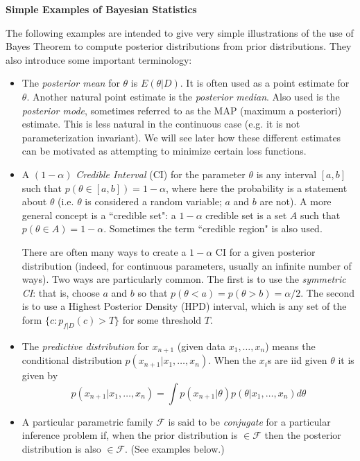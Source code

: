 \documentclass{article}[11pt]
\begin{document}


\begin{center}
\Large\bf Simple Examples of Bayesian Statistics
\end{center}
\vskip 6mm
\normalsize

The following examples are intended to give
very simple illustrations of the use of Bayes Theorem
to compute posterior distributions from prior distributions. They also introduce some important
terminology:

\begin{itemize}
\item The {\it posterior mean} for $\theta$ is $E(\theta | D)$. It is often used as a point estimate for $\theta$. Another natural point estimate is the {\it posterior median}. Also used is the {\it posterior mode}, sometimes referred to as the MAP (maximum a posteriori) estimate. This is less natural in the continuous case (e.g. it is not parameterization invariant). We will see later how these different estimates can be motivated as attempting to minimize certain loss functions.
\item A $(1-\alpha)$ {\it Credible Interval} (CI) for the parameter $\theta$ is any interval $[a,b]$ such that $p(\theta \in [a,b])= 1-\alpha$, where here the probability is a statement about $\theta$ (i.e. $\theta$ is considered a random variable; $a$ and $b$ are not).  A more general concept is a ``credible set": a $1-\alpha$ credible set is a set $A$ such that $p(\theta \in A)= 1-\alpha$. Sometimes the term ``credible region" is also used.

There are often many  ways to create a $1-\alpha$ CI for a given posterior distribution (indeed, for continuous parameters, usually an infinite number of ways). Two ways are particularly common. The first is to use the {\it symmetric CI}: that is, choose $a$ and $b$ so that $p(\theta < a) = p(\theta>b) = \alpha/2$. The second is to
use a Highest Posterior Density (HPD) interval,
which is any set of the form $\{c:p_{f|D}(c) > T\}$
for some threshold $T$.



\item The {\it predictive distribution} for $x_{n+1}$ (given data $x_1,\dots,x_n$) means the conditional distribution $p(x_{n+1} | x_1,\dots,x_n)$. When the $x_i$s are iid given $\theta$ it is given by
\begin{equation}
p(x_{n+1} | x_1,\dots,x_n) = \int p(x_{n+1} | \theta) p(\theta | x_1,\dots,x_n) d\theta
\end{equation}
\item A particular parametric family $\mathcal{F}$ is said to be {\it conjugate} for a particular inference problem if, when the prior distribution is $\in \mathcal{F}$ then the posterior distribution is also $\in \mathcal{F}$. (See examples below.)
\end{itemize}
\end{document}

